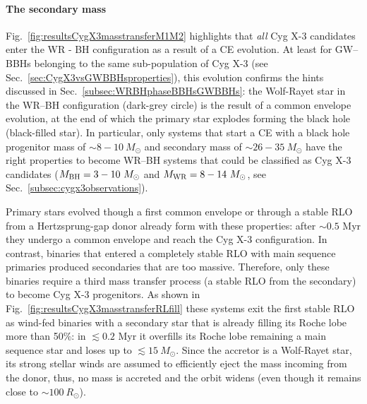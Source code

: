 \documentclass[a4paper,titlepage]{book}     	%
\newcommand{\sun}{\ensuremath{_\odot}}
\newcommand{\msun}{\ensuremath{M\sun}}
\newcommand{\rsun}{R_{\odot}}
\newcommand{\mwr}{\ensuremath{M_\textup{WR}}}
\newcommand{\mbh}{\ensuremath{M_\textup{BH}}}
\begin{document}
\paragraph{The secondary mass} Fig.\ \ref{fig:resultsCygX3masstransferM1M2} highlights that \emph{all} Cyg X-3 candidates enter the WR - BH configuration as a result of a CE evolution. At least for GW--BBHs belonging to the same sub-population of Cyg X-3 (see Sec.\ \ref{sec:CygX3vsGWBBHsproperties}), this evolution confirms the hints discussed in Sec.\ \ref{subsec:WRBHphaseBBHsGWBBHs}: the Wolf-Rayet star in the WR--BH configuration (dark-grey circle) is the result of a common envelope evolution, at the end of which the primary star explodes forming the black hole (black-filled star). In particular, only systems that start a CE with a black hole progenitor mass of $\sim 8-10~\msun$ and secondary mass of $\sim 26-35~\msun$ have the right properties to become WR--BH systems that could be classified as Cyg X-3 candidates ($\mbh = 3-10~\msun$ and $\mwr = 8-14~\msun$, see Sec.\ \ref{subsec:cygx3observations}).

Primary stars evolved though a first common envelope or through a stable RLO from a Hertzsprung-gap donor already form with these properties: after $\sim 0.5$ Myr they undergo a common envelope and reach the Cyg X-3 configuration. In contrast, binaries that entered a completely stable RLO with main sequence primaries produced secondaries that are too massive. Therefore, only these binaries require a third mass transfer process (a stable RLO from the secondary) to become Cyg X-3 progenitors. As shown in Fig.\ \ref{fig:resultsCygX3masstransferRLfill} these systems exit the first stable RLO as wind-fed binaries with a secondary star that is already filling its Roche lobe more than 50\%: in $\lesssim 0.2$ Myr it overfills its Roche lobe remaining a main sequence star and loses up to $\lesssim 15~\msun$. Since the accretor is a Wolf-Rayet star, its strong stellar winds are assumed to efficiently eject the mass incoming from the donor, thus, no mass is accreted and the orbit widens (even though it remains close to $\sim 100~\rsun$).
\end{document}

